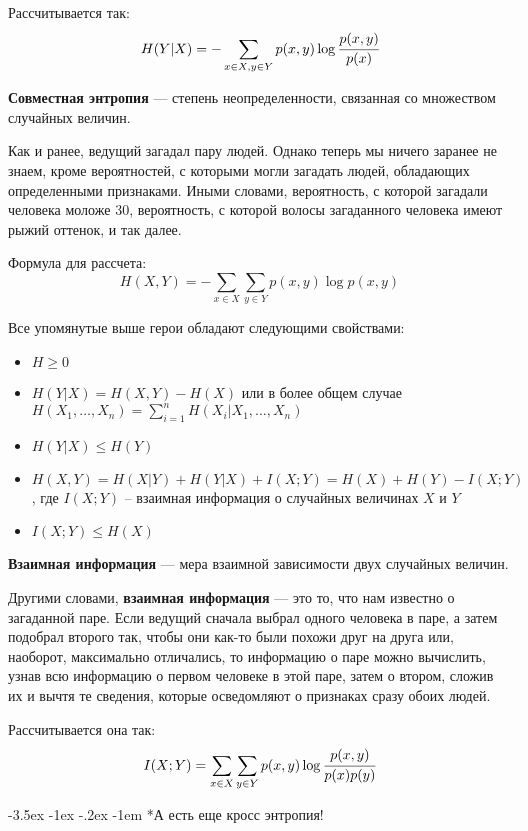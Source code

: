 \documentclass[a4paper, 12pt]{scrreprt}
\makeatletter
\newcommand{\ot}[1]{\textcolor[rgb]{.55,.45,.55}{#1}}
\renewcommand\section{\@startsection{section}{1}{\z@}%
        {-3.5ex \@plus -1ex \@minus -.2ex}%
        {-1em}%
        {\normalfont\large\slshape\bfseries\ot}}
\makeatother
\begin{document}
Рассчитывается так:
\[H(Y|X)=-\sum\limits_{x\in X, y\in Y} p(x, y)\log \cfrac{p(x, y)}{p(x)} \]

\begin{siderules}
    \textbf{Совместная энтропия} --- степень неопределенности, связанная со множеством случайных величин.
\end{siderules}

Как и ранее, ведущий загадал пару людей. Однако теперь мы ничего заранее не знаем, кроме вероятностей, с которыми могли загадать людей, обладающих определенными признаками. Иными словами, вероятность, с которой загадали человека моложе 30, вероятность, с которой волосы загаданного человека имеют рыжий оттенок, и так далее.

Формула для рассчета:
\[H(X, Y)=-\sum\limits_{x\in X}\sum\limits_{y\in Y} p(x, y)\log p(x ,y) \]

Все упомянутые выше герои обладают следующими свойствами:

\begin{itemize}
    \item $H \geqslant 0$
    \item $H(Y|X)=H(X, Y)-H(X)$ или в более общем случае $H(X_1, \ldots, X_n)=\sum\limits_{i=1}^n H(X_i|X_1, \ldots, X_n)$
    \item $H(Y|X)\leqslant H(Y)$
    \item $H(X, Y)=H(X|Y)+H(Y|X)+I(X; Y)=H(X)+H(Y)-I(X; Y)$, где $I(X; Y)$ -- взаимная информация о случайных величинах $X$ и $Y$
    \item $I(X; Y)\leqslant H(X)$
\end{itemize}

\begin{siderules}
    \textbf{Взаимная информация} --- мера взаимной зависимости двух случайных величин.
\end{siderules}

Другими словами, \textbf{взаимная информация} --- это то, что нам известно о загаданной паре. Если ведущий сначала выбрал одного человека в паре, а затем подобрал второго так, чтобы они как-то были похожи друг на друга или, наоборот, максимально отличались, то информацию о паре можно вычислить, узнав всю информацию о первом человеке в этой паре, затем о втором, сложив их и вычтя те сведения, которые осведомляют о признаках сразу обоих людей.

Рассчитывается она так:
\[I(X; Y)=\sum\limits_{x\in X}\sum\limits_{y\in Y} p(x, y)\log \cfrac{p(x, y)}{p(x)p(y)} \]

\section*{А есть еще кросс энтропия!}~\
\end{document}
